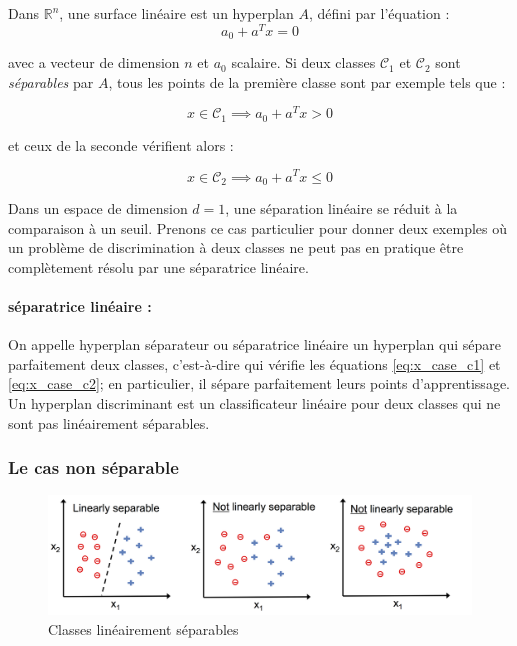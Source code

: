 		Dans $\mathbb{R}^n$, une surface linéaire est un hyperplan $A$, défini par l'équation :
		$$ 
			a_0  + a^Tx = 0
		$$
		
		avec a vecteur de dimension $n$ et $a_0$ scalaire. Si deux classes $\mathcal{C}_1$ et $\mathcal{C}_2$ sont \textit{séparables} par $A$, tous les points de la première classe sont par exemple tels que :
		
			\begin{equation}\label{eq:x_case_c1}
			 x \in \mathcal{C}_1 \implies a_0 + a^Tx > 0
			\end{equation}
		
		et ceux de la seconde vérifient alors :
		
			\begin{equation}\label{eq:x_case_c2}
				x \in \mathcal{C}_2 \implies a_0 + a^Tx \leq 0
			\end{equation}
			
		
		Dans un espace de dimension $d = 1$, une séparation linéaire se réduit à la comparaison à un seuil. Prenons ce cas particulier pour donner deux exemples où un problème de discrimination à deux classes ne peut pas en pratique être complètement résolu par une séparatrice linéaire.
		
		\paragraph* {séparatrice linéaire :}On appelle hyperplan séparateur ou séparatrice linéaire un hyperplan qui sépare parfaitement deux classes, c'est-à-dire qui vérifie les équations \ref{eq:x_case_c1} et \ref{eq:x_case_c2}; en particulier, il sépare parfaitement leurs points d'apprentissage. Un hyperplan discriminant est un classificateur linéaire pour deux classes qui ne sont pas linéairement séparables. \cite{antoine2018apprentissage}
		
		
		
		
		
		\subsubsection{Le cas non séparable}
		\begin{figure}[bth]%
			\centering
			\includegraphics[width=\textwidth]{images/linearly_separable.png}
			\caption{Classes linéairement séparables \cite[image de][p. 48]{ml2008python}
			}
			\label{fig:linearly_separable}
		\end{figure}
	
